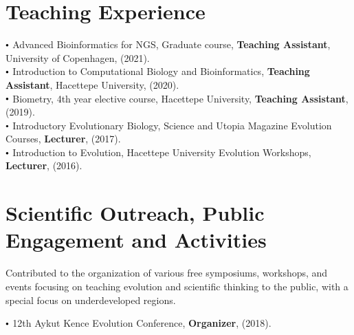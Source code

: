 \documentclass[letterpaper,10.5pt]{article}
\newcommand\sbullet[1][.5]{\mathbin{\vcenter{\hbox{\scalebox{#1}{$\bullet$}}}}}
\begin{document}

\section{Teaching Experience}

$\sbullet[.6]$ \hspace{0.74cm}  Advanced Bioinformatics for NGS, Graduate course, \textbf{Teaching Assistant}, University of Copenhagen, (2021). \\
$\sbullet[.6]$ \hspace{0.74cm}  Introduction to Computational Biology and Bioinformatics, \textbf{Teaching Assistant}, Hacettepe University, (2020).\\
$\sbullet[.6]$ \hspace{0.74cm}  Biometry, 4th year elective course, Hacettepe University, \textbf{Teaching Assistant}, (2019). \\
$\sbullet[.6]$ \hspace{0.74cm}  Introductory Evolutionary Biology, Science and Utopia Magazine Evolution Courses, \textbf{Lecturer}, (2017). \\
$\sbullet[.6]$ \hspace{0.74cm}  Introduction to Evolution, Hacettepe University Evolution Workshops, \textbf{Lecturer}, (2016). \\



\section{Scientific Outreach, Public Engagement and Activities}

Contributed to the organization of various free symposiums, workshops, and events focusing on teaching evolution and scientific thinking to the public, with a special focus on underdeveloped regions. \\

\smallskip

$\sbullet[.6]$ \hspace{0.74cm}  12th Aykut Kence Evolution Conference, \textbf{Organizer}, (2018). \\
\smallskip
\end{document}
